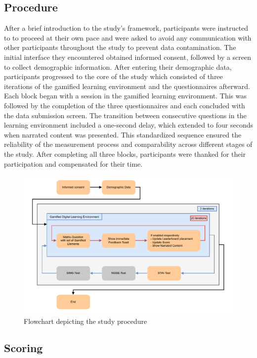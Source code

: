 \subsection{Procedure}
After a brief introduction to the study's framework, participants were instructed to to proceed at their own pace and were asked to avoid any communication with other participants throughout the study to prevent data contamination.
The initial interface they encountered obtained informed consent, followed by a screen to collect demographic information.
After entering their demographic data, participants progressed to the core of the study which consisted of three iterations of the gamified learning environment and the questionnaires afterward.
Each block began with a session in the gamified learning environment.
This was followed by the completion of the three questionnaires and each concluded with the data submission screen.
The transition between consecutive questions in the learning environment included a one-second delay, which extended to four seconds when narrated content was presented.
This standardized sequence ensured the reliability of the measurement process and comparability across different stages of the study.
After completing all three blocks, participants were thanked for their participation and compensated for their time.
\begin{figure}[H]
  \centering
  \includegraphics[width=\textwidth]{img/Procedure.pdf}
  \caption{Flowchart depicting the study procedure}
  \label{fig:procedureFlowchart}
\end{figure}


\subsection{Scoring}

